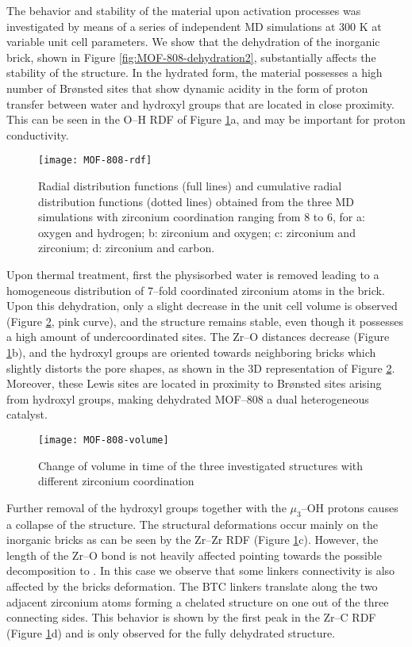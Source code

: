 \npar
The behavior and stability of the material upon activation processes was investigated by means of a series of independent MD simulations at 300 K at variable unit cell parameters. We show that the dehydration of the inorganic brick, shown in Figure \ref{fig:MOF-808-dehydration2}, substantially affects the stability of the structure. In the hydrated form, the material possesses a high number of Br\o{}nsted sites that show dynamic acidity in the form of proton transfer between water and hydroxyl groups that are located in close proximity. This can be seen in the O--H RDF of Figure \ref{fig:MOF-808-rdf}a, and may be important for proton conductivity. 
\begin{figure}[!htbp]
	\centering
	\texttt{[image: MOF-808-rdf]}
	\caption{Radial distribution functions (full lines) and cumulative radial distribution functions (dotted lines) obtained from the three MD simulations with zirconium coordination ranging from 8 to 6, for a: oxygen and hydrogen; b: zirconium and oxygen; c: zirconium and zirconium; d: zirconium and carbon.}
	\label{fig:MOF-808-rdf}
\end{figure}
\npar
Upon thermal treatment, first the physisorbed water is removed leading to a homogeneous distribution of 7--fold coordinated zirconium atoms in the brick. Upon this dehydration, only a slight decrease in the unit cell volume is observed (Figure \ref{fig:MOF-808-volume}, pink curve), and the structure remains stable, even though it possesses a high amount of undercoordinated sites. The Zr--O distances decrease (Figure \ref{fig:MOF-808-rdf}b), and the hydroxyl groups are oriented towards neighboring bricks which slightly distorts the pore shapes, as shown in the 3D representation of Figure \ref{fig:MOF-808-volume}. Moreover, these Lewis sites are located in proximity to Br\o{}nsted sites arising from hydroxyl groups, making dehydrated MOF--808 a dual heterogeneous catalyst. 
\npar
\begin{figure}[!htbp]
	\centering
	\texttt{[image: MOF-808-volume]}
	\caption{Change of volume in time of the three investigated structures with different zirconium coordination}
	\label{fig:MOF-808-volume}
\end{figure}
Further removal of the hydroxyl groups together with the $\mu_3$--OH protons causes a collapse of the structure. The structural deformations occur mainly on the inorganic bricks as can be seen by the Zr--Zr RDF (Figure \ref{fig:MOF-808-rdf}c). However, the length of the Zr--O bond is not heavily affected pointing towards the possible decomposition to . In this case we observe that some linkers connectivity is also affected by the bricks deformation. The BTC linkers translate along the two adjacent zirconium atoms forming a chelated structure on one out of the three connecting sides. This behavior is shown by the first peak in the Zr--C RDF (Figure \ref{fig:MOF-808-rdf}d) and is only observed for the fully dehydrated structure. 
